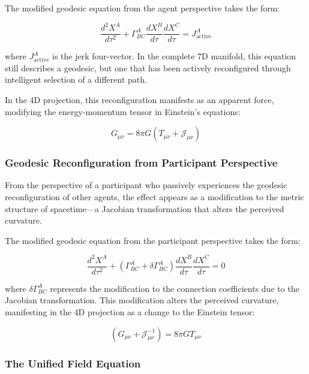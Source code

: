 \documentclass{article}
\begin{document}
The modified geodesic equation from the agent perspective takes the form:

\begin{equation}
\frac{d^2 X^A}{d\tau^2} + \Gamma^A_{BC} \frac{dX^B}{d\tau} \frac{dX^C}{d\tau} = J^A_{\text{active}}
\end{equation}

where $J^A_{\text{active}}$ is the jerk four-vector. In the complete 7D manifold, this equation still describes a geodesic, but one that has been actively reconfigured through intelligent selection of a different path.

In the 4D projection, this reconfiguration manifests as an apparent force, modifying the energy-momentum tensor in Einstein's equations:

\begin{equation}
G_{\mu\nu} = 8\pi G (T_{\mu\nu} + \mathcal{J}_{\mu\nu})
\end{equation}

\subsubsection{Geodesic Reconfiguration from Participant Perspective}

From the perspective of a participant who passively experiences the geodesic reconfiguration of other agents, the effect appears as a modification to the metric structure of spacetime—a Jacobian transformation that alters the perceived curvature.

The modified geodesic equation from the participant perspective takes the form:

\begin{equation}
\frac{d^2 X^A}{d\tau^2} + (\Gamma^A_{BC} + \delta\Gamma^A_{BC}) \frac{dX^B}{d\tau} \frac{dX^C}{d\tau} = 0
\end{equation}

where $\delta\Gamma^A_{BC}$ represents the modification to the connection coefficients due to the Jacobian transformation. This modification alters the perceived curvature, manifesting in the 4D projection as a change to the Einstein tensor:

\begin{equation}
(G_{\mu\nu} + \mathcal{J}^{-1}_{\mu\nu}) = 8\pi G T_{\mu\nu}
\end{equation}

\subsubsection{The Unified Field Equation}
\end{document}
